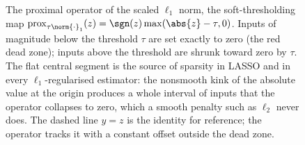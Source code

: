 \begin{figure}[ht]
\centering
{}
\caption[The soft-thresholding operator]{The proximal operator of
the scaled $\ell_{1}$ norm, the soft-thresholding map
$\operatorname{prox}_{\tau\norm{\cdot}_{1}}(z) =
\sgn(z)\max(\abs{z}-\tau, 0)$. Inputs of magnitude below the
threshold $\tau$ are set exactly to zero (the red dead zone); inputs
above the threshold are shrunk toward zero by $\tau$. The flat
central segment is the source of sparsity in LASSO and in every
$\ell_{1}$-regularised estimator: the nonsmooth kink of the absolute
value at the origin produces a whole interval of inputs that the
operator collapses to zero, which a smooth penalty such as
$\ell_{2}$ never does. The dashed line $y=z$ is the identity for
reference; the operator tracks it with a constant offset outside the
dead zone.}
\label{fig:vol02:ch15:soft-threshold}
\end{figure}
